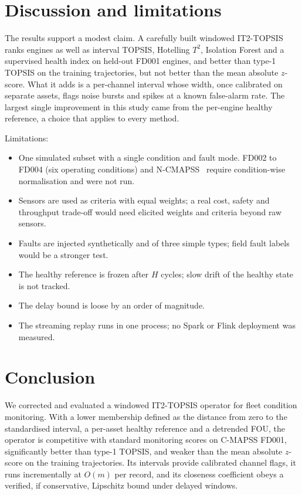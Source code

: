 \documentclass[journal,10pt,twocolumn]{IEEEtran}
\begin{document}
\section{Discussion and limitations}
The results support a modest claim. A carefully built windowed IT2-TOPSIS ranks engines as well as interval TOPSIS, Hotelling $T^2$, Isolation Forest and a supervised health index on held-out FD001 engines, and better than type-1 TOPSIS on the training trajectories, but not better than the mean absolute $z$-score. What it adds is a per-channel interval whose width, once calibrated on separate assets, flags noise bursts and spikes at a known false-alarm rate. The largest single improvement in this study came from the per-engine healthy reference, a choice that applies to every method.

Limitations:
\begin{itemize}
\item One simulated subset with a single condition and fault mode. FD002 to FD004 (six operating conditions) and N-CMAPSS~\cite{arias2021} require condition-wise normalisation and were not run.
\item Sensors are used as criteria with equal weights; a real cost, safety and throughput trade-off would need elicited weights and criteria beyond raw sensors.
\item Faults are injected synthetically and of three simple types; field fault labels would be a stronger test.
\item The healthy reference is frozen after $H$ cycles; slow drift of the healthy state is not tracked.
\item The delay bound is loose by an order of magnitude.
\item The streaming replay runs in one process; no Spark or Flink deployment was measured.
\end{itemize}

\section{Conclusion}
We corrected and evaluated a windowed IT2-TOPSIS operator for fleet condition monitoring. With a lower membership defined as the distance from zero to the standardised interval, a per-asset healthy reference and a detrended FOU, the operator is competitive with standard monitoring scores on C-MAPSS FD001, significantly better than type-1 TOPSIS, and weaker than the mean absolute $z$-score on the training trajectories. Its intervals provide calibrated channel flags, it runs incrementally at $O(m)$ per record, and its closeness coefficient obeys a verified, if conservative, Lipschitz bound under delayed windows.
\end{document}
